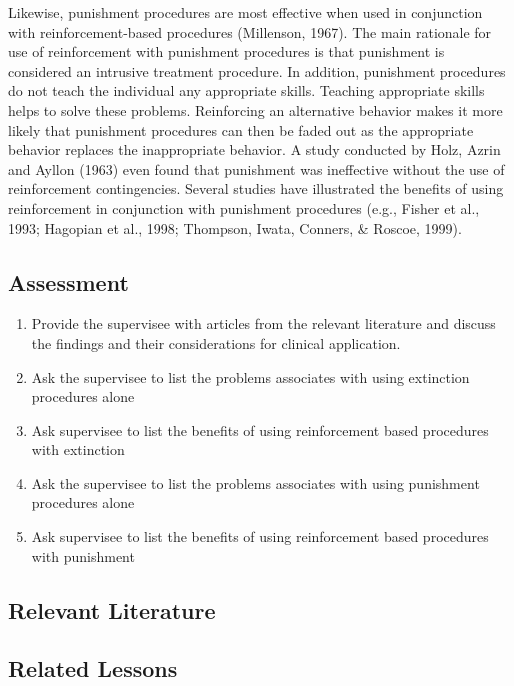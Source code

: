 Likewise, punishment procedures are most effective when used in conjunction with reinforcement-based procedures (Millenson, 1967).  The main rationale for use of reinforcement with punishment procedures is that punishment is considered an intrusive treatment procedure. In addition, punishment procedures do not teach the individual any appropriate skills. Teaching appropriate skills helps to solve these problems. Reinforcing an alternative behavior makes it more likely that punishment procedures can then be faded out as the appropriate behavior replaces the inappropriate behavior. A study conducted by Holz, Azrin and Ayllon (1963) even found that punishment was ineffective without the use of reinforcement contingencies.  Several studies have illustrated the benefits of using reinforcement in conjunction with punishment procedures (e.g., Fisher et al., 1993; Hagopian et al., 1998; Thompson, Iwata, Conners, \& Roscoe, 1999).
%
\subsection{Assessment}
\begin{enumerate}
\item Provide the supervisee with articles from the relevant literature and discuss the findings and their considerations for clinical application. 
\item Ask the supervisee to list the problems associates with using extinction procedures alone 
\item Ask supervisee to list the benefits of using reinforcement based procedures with extinction
\item Ask the supervisee to list the problems associates with using punishment procedures alone
\item Ask supervisee to list the benefits of using reinforcement based procedures with punishment
\end{enumerate}
%
\subsection{Relevant Literature}
\begin{refsection}
\nocite{cooper2007applied,
        fisher1993functional,
        hagopian1998effectiveness,
        holz1963elimination,
        lerman1999side,
        millenson1967principles,
        piazza2003relative,
        thompson1999effects}
\printbibliography[heading=none]
\end{refsection}
\subsection{Related Lessons} 
\fourbTen{}\\
\fourcOne{}\\ 
\fourcTwo{}\\ 
\fourcThree{}\\
\fourdOne{}\\
\fourdTwo{}\\
\fourdFifteen{}\\
\fourdSixteen{}\\
\fourdSeventeen{}\\
\fourdEighteen{}\\
\fourdTwenty{}\\
\fourdTwentyOne{}\\
\fouriSix{}\\
\fouriSeven{}\\
\fourjTwo{}\\
\fourjTen{}\\

